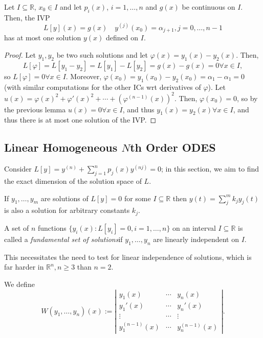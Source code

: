 \begin{proposition}
    Let $I \subseteq \mathbb{R}$, $x_0 \in I$ and let $p_i(x)$, $i = 1, \dots, n$ and $g(x)$ be continuous on $I$. Then, the IVP\[
    L[y](x) = g(x) \quad y^{(j)}(x_0) = \alpha_{j+1}, j = 0, \dots, n - 1
    \]
    has at most one solution $y(x)$ defined on $I$.
\end{proposition}
\begin{proof}
    Let $y_1, y_2$ be two such solutions and let $\varphi(x) = y_1(x) - y_2(x)$. Then, \[
        L[\varphi] = L[y_1 - y_2] = L[y_1] - L[y_2] = g(x) - g(x) = 0 \forall x \in I,
    \]
    so $L[\varphi] = 0 \forall x \in I$. Moreover, $\varphi(x_0) = y_1(x_0) - y_2(x_0) = \alpha_1 - \alpha_1 = 0$ (with similar computations for the other ICs wrt derivatives of $\varphi$). Let $u(x) = \varphi(x)^2 + \varphi'(x)^2 + \cdots + (\varphi^{(n-1)}(x))^2$. Then, $\varphi(x_0) = 0$, so by the previous lemma $u(x) = 0 \forall x\in I$, and thus $y_1(x) = y_2(x) \forall x \in I$, and thus there is at most one solution of the IVP.
\end{proof}

\subsection{Linear Homogeneous \texorpdfstring{$N$th}{Nth} Order ODES}

Consider $L[y] = y^{(n)} + \sum_{j=1}^n p_j(x)y^{(nj)} = 0$; in this section, we aim to find the exact dimension of the solution space of $L$.

\begin{theorem}
    If $y_1, \dots, y_m$ are solutions of $L[y] = 0$ for some $I \subseteq \mathbb{R}$ then $y(t) = \sum_j^m k_j y_j(t)$ is also a solution for arbitrary constants $k_j$.
\end{theorem}

\begin{definition}
    A set of $n$ functions $\{y_i(x) : L[y_i] = 0, i = 1, \dots, n\}$ on an interval $I \subseteq \mathbb{R}$ is called a \emph{fundamental set of solutions}if $y_1, \dots, y_n$ are linearly independent on $I$.
\end{definition}

This necessitates the need to test for linear independence of solutions, which is far harder in $\mathbb{R}^n, n \geq 3$ than $n = 2$.

\begin{definition}[Wronskian]
    We define \[
    W(y_1, \dots, y_n)(x) := \left|\begin{matrix}
        y_1(x) & \cdots & y_n(x)\\
        y_1'(x) & \cdots & y_n'(x)\\
        \vdots & \cdots & \vdots \\
        y_1^{(n-1)}(x) & \cdots & y_n^{(n-1)}(x)
    \end{matrix}\right|.    
    \]
\end{definition}

